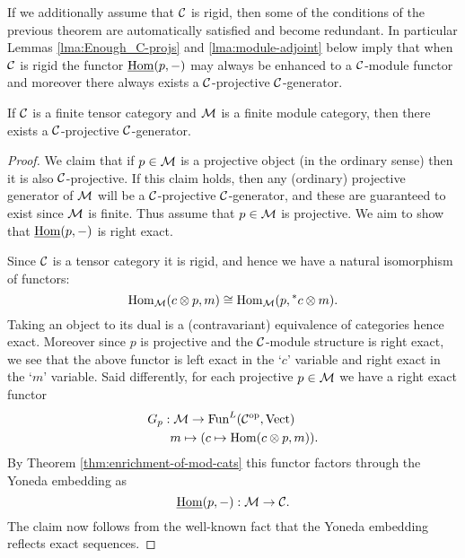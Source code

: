 \documentclass{amsart}
\begin{document}

If we additionally assume that $\mathcal C$ is rigid, then some of the conditions of the previous theorem are automatically satisfied and become redundant. In particular Lemmas \ref{lma:Enough_C-projs} and \ref{lma:module-adjoint} below imply that when $\mathcal C$ is rigid the functor $\operatorname{\underline{Hom}}(p,-)$ may always be enhanced to a $\mathcal C$-module functor and moreover there always exists a $\mathcal C$-projective $\mathcal C$-generator.

\begin{lemma}{\cite[\S 2.11]{EGNO}} \label{lma:Enough_C-projs}
	If $\mathcal C$ is a finite tensor category and $\mathcal M$ is a finite module category, then there exists a $\mathcal C$-projective $\mathcal C$-generator. 
\end{lemma}  

\begin{proof}
	We claim that if $p \in \mathcal M$ is a projective object (in the ordinary sense) then it is also $\mathcal C$-projective. If this claim holds, then any (ordinary) projective generator of $\mathcal M$ will be a $\mathcal C$-projective $\mathcal C$-generator, and these are guaranteed to exist since $\mathcal M$ is finite. Thus assume that $p \in \mathcal M$ is projective.  We aim to show that $\operatorname{\underline{Hom}}(p, -)$ is right exact. 
	
	Since $\mathcal C$ is a tensor category it is rigid, and hence we have a natural isomorphism of functors:
\begin{equation*}
	\operatorname{Hom}_{\mathcal M}(c \otimes p, m) \cong \operatorname{Hom}_{\mathcal M}(p, {}^*c \otimes m).
\end{equation*}
Taking an object to its dual is a (contravariant) equivalence of categories hence exact. Moreover since $p$ is projective and the $\mathcal C$-module structure is right exact, we see that the above functor is left exact in the `$c$' variable and right exact in the `$m$' variable. Said differently, for each projective $p \in \mathcal M$ we have a right exact functor
\begin{align*}
	G_p: & \; \mathcal M \to \operatorname{Fun}^L(\mathcal C^{\mathrm{op}}, \mathrm{Vect}) \\
	& m \mapsto (c \mapsto \operatorname{Hom}(c \otimes p, m)).
\end{align*}
By Theorem \ref{thm:enrichment-of-mod-cats} this functor factors through the Yoneda embedding as
\begin{equation*}
	\operatorname{\underline{Hom}}(p, -): \mathcal M \to \mathcal C.
\end{equation*}
The claim now follows from the well-known fact that the Yoneda embedding reflects exact sequences. 
\end{proof}
\end{document}

